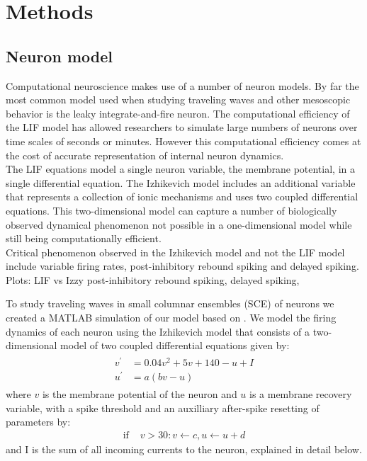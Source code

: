\documentclass[12pt]{article}
\begin{document}
\section{Methods}

\subsection{Neuron model}
Computational neuroscience makes use of a number of neuron models.
By far the most common model used when studying traveling waves and other mesoscopic behavior is the leaky integrate-and-fire neuron.
The computational efficiency of the LIF model has allowed researchers to simulate large numbers of neurons over time scales of seconds or minutes.
However this computational efficiency comes at the cost of accurate representation of internal neuron dynamics.
\\
The LIF equations model a single neuron variable, the membrane potential, in a single differential equation.
The Izhikevich model includes an additional variable that represents a collection of ionic mechanisms and uses two coupled differential equations.
This two-dimensional model can capture a number of biologically observed dynamical phenomenon not possible in a one-dimensional model while still being computationally efficient.
\\
Critical phenomenon observed in the Izhikevich model and not the LIF model include variable firing rates, post-inhibitory rebound spiking and delayed spiking.
Plots: LIF vs Izzy post-inhibitory rebound spiking, delayed spiking, 

To study traveling waves in small columnar ensembles (SCE) of neurons we created a MATLAB simulation of our model based on \parencite{izhikevich2003}.
We model the firing dynamics of each neuron using the Izhikevich model \parencite{izhikevich2003} that consists of a two-dimensional model of two coupled differential equations given by:
\begin{align}
 \begin{split}
  v^\prime &= 0.04v^2+5v+140-u+I \label{eq:neuron_v} \\
  u^\prime &= a(bv-u)
 \end{split}
\end{align}
where $v$ is the membrane potential of the neuron and $u$ is a membrane recovery variable, with a spike threshold and an auxilliary after-spike resetting of parameters by:
\begin{align}
  \text{if } &v>30: v\leftarrow c, u\leftarrow u+d
\end{align}
and I is the sum of all incoming currents to the neuron, explained in detail below. 
\end{document}
